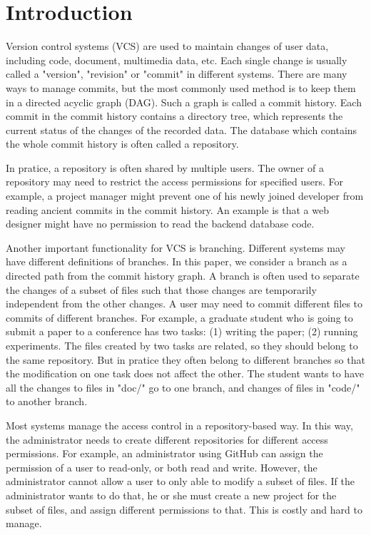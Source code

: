 \section{Introduction}
\label{s:intro}

Version control systems (VCS) are used to maintain changes of user data,
including code, document, multimedia data, etc. Each single
change is usually called a "version", "revision" or "commit" in different
systems. There are many ways to manage commits, but the most commonly used
method is to keep them in a directed acyclic graph (DAG). Such a graph is called
a commit history. Each commit in the commit history contains a directory tree,
which represents the current status of the changes of the recorded data. The
database which contains the whole commit history is often called a repository.

In pratice, a repository is often shared by multiple users. The owner of a
repository may need to restrict the access permissions for specified users. For
example, a project manager might prevent one of his newly joined developer from
reading ancient commits in the commit history. An example is that a web designer
might have no permission to read the backend database code.

Another important functionality for VCS is branching. Different systems may have
different definitions of branches. In this paper, we consider a branch as a
directed path from the commit history graph. A branch is often used to separate
the changes of a subset of files such that those changes are temporarily
independent from the other changes. A user may need to commit different files to commits of different
branches. For example, a graduate student who is going to submit a paper to a
conference has two tasks: (1) writing the paper; (2) running experiments. The
files created by two tasks are related, so they should belong to the same
repository. But in pratice they often belong to different branches so that the
modification on one task does not affect the other. The student wants to have
all the changes to files in "doc/" go to one branch, and changes of files in
"code/" to another branch.

Most systems manage the access control in a repository-based way. In this way,
the administrator needs to create different repositories for different access
permissions. For example, an administrator using GitHub\cite{github} can assign
the permission of a user to read-only, or both read and write. However, the
administrator cannot allow a user to only able to modify a subset of files. If
the administrator wants to do that, he or she must create a new project for the
subset of files, and assign different permissions to that. This is costly and
hard to manage.


